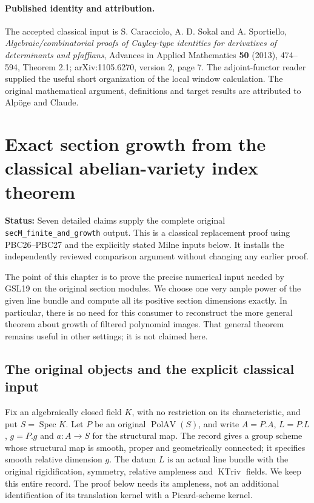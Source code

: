 \documentclass[11pt,a4paper]{article}
\numberwithin{equation}{section}
\theoremstyle{remark}\newtheorem{remark}[theorem]{Remark}
\newcommand{\status}[1]{\textbf{Status:} #1}
\begin{document}
\paragraph{Published identity and attribution.}
The accepted classical input is S. Caracciolo, A. D. Sokal and
A. Sportiello, \emph{Algebraic/combinatorial proofs of Cayley-type
identities for derivatives of determinants and pfaffians},
Advances in Applied Mathematics \textbf{50} (2013), 474--594,
Theorem 2.1; arXiv:1105.6270, version 2, page 7.
The adjoint-functor reader supplied the useful short organization of
the local window calculation.  The original mathematical argument,
definitions and target results are attributed to Alp\"oge and Claude.


\section{Exact section growth from the classical abelian-variety index theorem}
\label{sec:SGV}

\status{Seven detailed claims supply the complete original
\texttt{sec\allowbreak M\_\allowbreak finite\_\allowbreak and\_\allowbreak growth} output.  This is a classical
replacement proof using PBC26--PBC27 and the explicitly stated Milne
inputs below.  It installs the independently reviewed comparison
argument without changing any earlier proof.}

The point of this chapter is to prove the precise numerical input
needed by GSL19 on the original section modules.  We choose one very
ample power of the given line bundle and compute all its positive
section dimensions exactly.  In particular, there is no need for this
consumer to reconstruct the more general theorem about growth of
filtered polynomial images.  That general theorem remains useful in
other settings; it is not claimed here.

\subsection*{The original objects and the explicit classical input}

Fix an algebraically closed field $K$, with no restriction on its
characteristic, and put $S=\operatorname{Spec}K$.  Let $P$ be an
original $\operatorname{PolAV}(S)$, and write
$A=P.A$, $L=P.L$, $g=P.g$ and $a:A\to S$ for the structural map.
The record gives a group scheme whose structural map is smooth, proper
and geometrically connected; it specifies smooth relative dimension
$g$.  The datum $L$ is an actual line bundle with the original
rigidification, symmetry, relative ampleness and $\operatorname{KTriv}$
fields.  We keep this entire record.  The proof below needs its
ampleness, not an additional identification of its translation kernel
with a Picard-scheme kernel.
\end{document}

